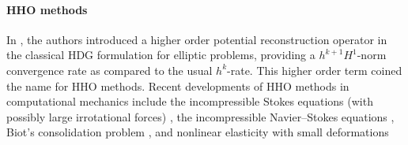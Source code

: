 \paragraph{HHO methods}

In \cite{di_pietro_hybrid_2015, di_pietro_arbitrary-order_2014}, the authors introduced a higher order potential reconstruction operator in the classical HDG formulation for elliptic problems, providing a $h^{k+1} H^1$-norm convergence rate as compared to the usual $h^k$-rate. This higher order term coined the name for HHO methods.
Recent developments of HHO methods in
computational mechanics include the incompressible Stokes
equations (with possibly large irrotational forces) \cite{di_pietro_discontinuous_2016}, the
incompressible Navier–Stokes equations \cite{di_pietro_hybrid_2018}, Biot’s consolidation problem \cite{boffi_nonconforming_2016}, and nonlinear elasticity with small
deformations \cite{botti_hybrid_2017}




